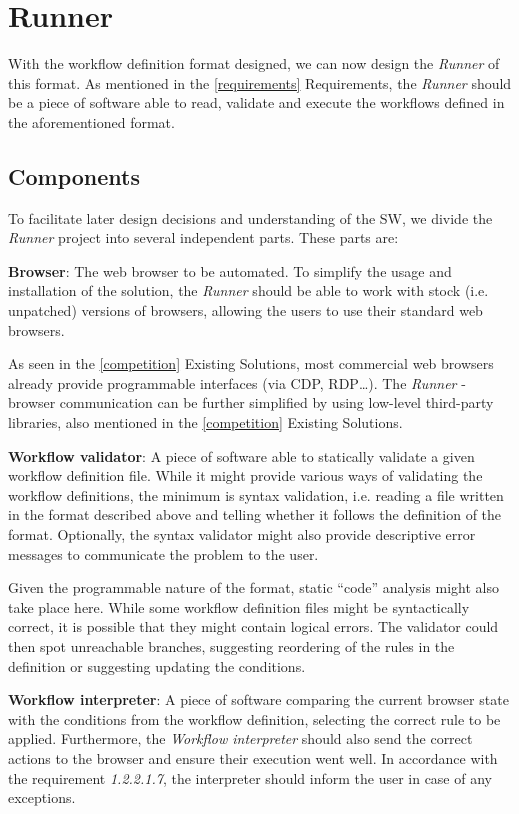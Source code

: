 \section{Runner}\label{runnerDesign}

With the workflow definition format designed, we can now design the \textit{Runner} of this format.
As mentioned in the \autoref{requirements} Requirements, the \textit{Runner} should be a piece of software able to read, validate and execute the workflows defined in the aforementioned format.

\subsection{Components}

To facilitate later design decisions and understanding of the \acs{SW}, we divide the \textit{Runner} project into several independent parts.
These parts are:

\emptyline
\textbf{Browser}:  
The web browser to be automated.
To simplify the usage and installation of the solution, the \textit{Runner} should be able to work with stock (i.e. unpatched) versions of browsers, allowing the users to use their standard web browsers.

As seen in the \autoref{competition} Existing Solutions, most commercial web browsers already provide programmable interfaces (via CDP, RDP\dots).
The \textit{Runner} - browser communication can be further simplified by using low-level third-party libraries, also mentioned in the \autoref{competition} Existing Solutions.

\emptyline
\textbf{Workflow validator}:
A piece of software able to statically validate a given workflow definition file.
While it might provide various ways of validating the workflow definitions, the minimum is syntax validation, i.e. reading a file written 
in the format described above and telling whether it follows the definition of the format.
Optionally, the syntax validator might also provide descriptive error messages to communicate the problem to the user.

Given the programmable nature of the format, static ``code'' analysis might also take place here. 
While some workflow definition files might be syntactically correct, it is possible that they might contain logical errors.
The validator could then spot unreachable branches, suggesting reordering of the rules in the definition or suggesting updating the conditions.

\emptyline
\textbf{Workflow interpreter}:  
A piece of software comparing the current browser state with the conditions from the workflow definition, selecting the correct rule to be applied.
Furthermore, the \textit{Workflow interpreter} should also send the correct actions to the browser and ensure their execution went well.
In accordance with the requirement \textit{1.2.2.1.7}, the interpreter should inform the user in case of any exceptions.

